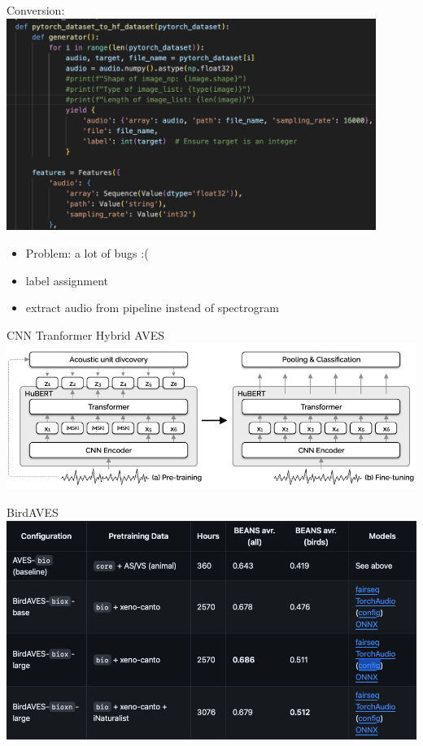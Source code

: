 \begin{frame}{Conversion:}
    \centering
    \includegraphics[height=0.7\textheight,width=0.9\textwidth,keepaspectratio]{images/converter.png}
    \begin{itemize}
        \item Problem: a lot of bugs :(
        \item label assignment
        \item extract audio from pipeline instead of spectrogram
    \end{itemize}
\end{frame}

\begin{frame}{CNN Tranformer Hybrid AVES}
    \centering
    \includegraphics[height=0.8\textheight,width=1\textwidth,keepaspectratio]{images/Aves_architecture.png}  
\end{frame}

\begin{frame}{BirdAVES}
    \centering
    \includegraphics[height=0.7\textheight,width=1\textwidth,keepaspectratio]{images/BirdAves.png}  
\end{frame}

